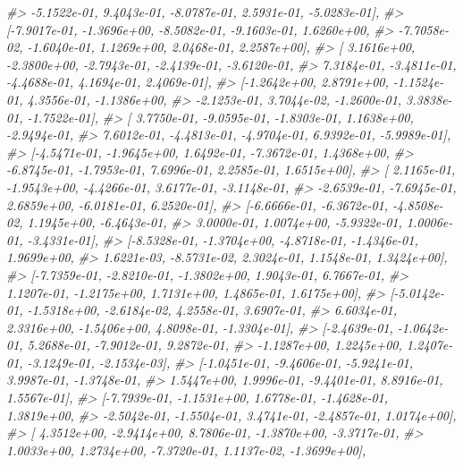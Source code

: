 \documentclass[]{book}
\newenvironment{Shaded}{\begin{snugshade}}{\end{snugshade}}
\newcommand{\CommentTok}[1]{\textcolor[rgb]{0.56,0.35,0.01}{\textit{#1}}}
\begin{document}
\begin{Shaded}
\begin{Highlighting}[]
\CommentTok{#>          -5.1522e-01,  9.4043e-01, -8.0787e-01,  2.5931e-01, -5.0283e-01],}
\CommentTok{#>         [-7.9017e-01, -1.3696e+00, -8.5082e-01, -9.1603e-01,  1.6260e+00,}
\CommentTok{#>          -7.7058e-02, -1.6040e-01,  1.1269e+00,  2.0468e-01,  2.2587e+00],}
\CommentTok{#>         [ 3.1616e+00, -2.3800e+00, -2.7943e-01, -2.4139e-01, -3.6120e-01,}
\CommentTok{#>           7.3184e-01, -3.4811e-01, -4.4688e-01,  4.1694e-01,  2.4069e-01],}
\CommentTok{#>         [-1.2642e+00,  2.8791e+00, -1.1524e-01,  4.3556e-01, -1.1386e+00,}
\CommentTok{#>          -2.1253e-01,  3.7044e-02, -1.2600e-01,  3.3838e-01, -1.7522e-01],}
\CommentTok{#>         [ 3.7750e-01, -9.0595e-01, -1.8303e-01,  1.1638e+00, -2.9494e-01,}
\CommentTok{#>           7.6012e-01, -4.4813e-01, -4.9704e-01,  6.9392e-01, -5.9989e-01],}
\CommentTok{#>         [-4.5471e-01, -1.9645e+00,  1.6492e-01, -7.3672e-01,  1.4368e+00,}
\CommentTok{#>          -6.8745e-01, -1.7953e-01,  7.6996e-01,  2.2585e-01,  1.6515e+00],}
\CommentTok{#>         [ 2.1165e-01, -1.9543e+00, -4.4266e-01,  3.6177e-01, -3.1148e-01,}
\CommentTok{#>          -2.6539e-01, -7.6945e-01,  2.6859e+00, -6.0181e-01,  6.2520e-01],}
\CommentTok{#>         [-6.6666e-01, -6.3672e-01, -4.8508e-02,  1.1945e+00, -6.4643e-01,}
\CommentTok{#>           3.0000e-01,  1.0074e+00, -5.9322e-01,  1.0006e-01, -3.4331e-01],}
\CommentTok{#>         [-8.5328e-01, -1.3704e+00, -4.8718e-01, -1.4346e-01,  1.9699e+00,}
\CommentTok{#>           1.6221e-03, -8.5731e-02,  2.3024e-01,  1.1548e-01,  1.3424e+00],}
\CommentTok{#>         [-7.7359e-01, -2.8210e-01, -1.3802e+00,  1.9043e-01,  6.7667e-01,}
\CommentTok{#>           1.1207e-01, -1.2175e+00,  1.7131e+00,  1.4865e-01,  1.6175e+00],}
\CommentTok{#>         [-5.0142e-01, -1.5318e+00, -2.6184e-02,  4.2558e-01,  3.6907e-01,}
\CommentTok{#>           6.6034e-01,  2.3316e+00, -1.5406e+00,  4.8098e-01, -1.3304e-01],}
\CommentTok{#>         [-2.4639e-01, -1.0642e-01,  5.2688e-01, -7.9012e-01,  9.2872e-01,}
\CommentTok{#>          -1.1287e+00,  1.2245e+00,  1.2407e-01, -3.1249e-01, -2.1534e-03],}
\CommentTok{#>         [-1.0451e-01, -9.4606e-01, -5.9241e-01,  3.9987e-01, -1.3748e-01,}
\CommentTok{#>           1.5447e+00,  1.9996e-01, -9.4401e-01,  8.8916e-01,  1.5567e-01],}
\CommentTok{#>         [-7.7939e-01, -1.1531e+00,  1.6778e-01, -1.4628e-01,  1.3819e+00,}
\CommentTok{#>          -2.5042e-01, -1.5504e-01,  3.4741e-01, -2.4857e-01,  1.0174e+00],}
\CommentTok{#>         [ 4.3512e+00, -2.9414e+00,  8.7806e-01, -1.3870e+00, -3.3717e-01,}
\CommentTok{#>           1.0033e+00,  1.2734e+00, -7.3720e-01,  1.1137e-02, -1.3699e+00],}

\end{Highlighting}
\end{Shaded}
\end{document}
